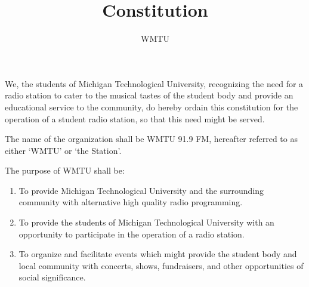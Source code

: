 \documentclass[12pt]{constitution}
\begin{document}
\title{Constitution}
\author{WMTU}
\date{}
\maketitle
\setcounter{tocdepth}{1}
\tableofcontents
\newpage

We, the students of Michigan Technological University, recognizing the need for a radio station to cater to the musical tastes of the student body and provide an educational service to the community, do hereby ordain this constitution for the operation of a student radio station, so that this need might be served.




The name of the organization shall be WMTU 91.9 FM, hereafter referred to as either `WMTU' or `the Station'.




The purpose of WMTU shall be:
\begin{enumerate}
\item To provide Michigan Technological University and the surrounding community with alternative high quality radio programming.
\item To provide the students of Michigan Technological University with an opportunity to participate in the operation of a radio station.
\item To organize and facilitate events which might provide the student body and local community with concerts, shows, fundraisers, and other opportunities of social significance.
\end{enumerate}


\end{document}
